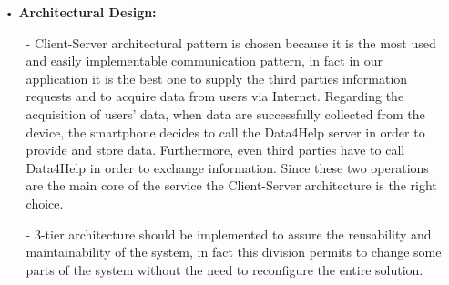 \begin{enumerate}
\item[•] \textbf{Architectural Design: }\\
	\begin{enumerate}
	\item[-] Client-Server architectural pattern is chosen because it is the most used and easily implementable communication pattern, in fact in our application it is the best one to supply the third parties information requests and to acquire data from users via Internet. 
Regarding the acquisition of users' data, when data are successfully collected from the device, the smartphone decides to call the Data4Help server in order to provide and store data. Furthermore, even third parties have to call Data4Help in order to exchange information. Since these two operations are the main core of the service the Client-Server architecture is the right choice. 

	\item[-]3-tier architecture should be implemented to assure the reusability and maintainability of the system, in fact this division permits to change some parts of the system without the need to reconfigure the entire solution.
	

\end{enumerate}
\end{enumerate}
